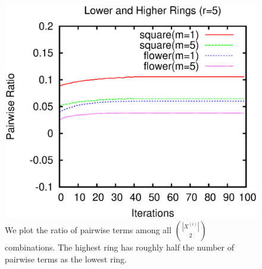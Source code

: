 \documentclass[smallextended]{svjour3}       %
\begin{document}
{{\begin{figure}
\center
\includegraphics[scale=0.5]{images/optimization/pairwise-ratio/plot-pairwiseratio-lowerHigher-concavities-probe.eps}
\caption{We plot the ratio of pairwise terms among all $\binom{|X^{(i)}|}{2}$ combinations. The highest ring has roughly half the number of pairwise terms as the lowest ring.}
\label{fig:ratio-pairwise-terms}
\end{figure}


}}
\end{document}
